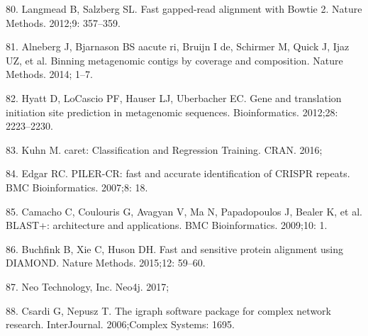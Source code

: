 \documentclass[12pt,]{article}
\begin{document}
\hypertarget{ref-Langmead:2012jh}{}
80. Langmead B, Salzberg SL. Fast gapped-read alignment with Bowtie 2.
Nature Methods. 2012;9: 357--359.

\hypertarget{ref-Alneberg:2014fc}{}
81. Alneberg J, Bjarnason BS aacute ri, Bruijn I de, Schirmer M, Quick
J, Ijaz UZ, et al. Binning metagenomic contigs by coverage and
composition. Nature Methods. 2014; 1--7.

\hypertarget{ref-Hyatt:2012cy}{}
82. Hyatt D, LoCascio PF, Hauser LJ, Uberbacher EC. Gene and translation
initiation site prediction in metagenomic sequences. Bioinformatics.
2012;28: 2223--2230.

\hypertarget{ref-caretClassificatio:ux5fU2Litux5f1}{}
83. Kuhn M. caret: Classification and Regression Training. CRAN. 2016;

\hypertarget{ref-Edgar:2007bh}{}
84. Edgar RC. PILER-CR: fast and accurate identification of CRISPR
repeats. BMC Bioinformatics. 2007;8: 18.

\hypertarget{ref-Camacho:2009fc}{}
85. Camacho C, Coulouris G, Avagyan V, Ma N, Papadopoulos J, Bealer K,
et al. BLAST+: architecture and applications. BMC Bioinformatics.
2009;10: 1.

\hypertarget{ref-Buchfink:2015ki}{}
86. Buchfink B, Xie C, Huson DH. Fast and sensitive protein alignment
using DIAMOND. Nature Methods. 2015;12: 59--60.

\hypertarget{ref-Neoj:Fuwr6PBN}{}
87. Neo Technology, Inc. Neo4j. 2017;

\hypertarget{ref-Theigraphsoftware:vh}{}
88. Csardi G, Nepusz T. The igraph software package for complex network
research. InterJournal. 2006;Complex Systems: 1695.
\end{document}
